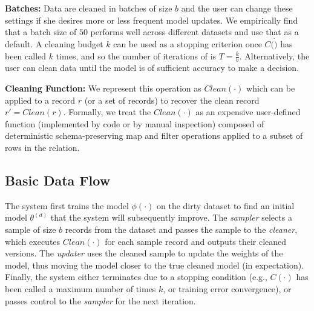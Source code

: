 \vspace{0.25em}

\noindent\textbf{Batches: } Data are cleaned in batches of size $b$ and the user can change these settings if she desires more or less frequent model updates.
We empirically find that a batch size of $50$ performs well across different datasets and use that as a default.
A cleaning budget $k$ can be used as a stopping criterion once $C(\dot)$ has been called $k$ times, and so the number of iterations of \sys is $T = \frac{k}{b}$.
Alternatively, the user can clean data until the model is of sufficient accuracy to make a decision.

\vspace{0.25em}

\noindent\textbf{Cleaning Function: } We represent this operation as $Clean(\cdot)$ which can be applied to a record $r$ (or a set of records) to recover the clean record $r' = Clean(r)$.
Formally, we treat the $Clean(\cdot)$ as an expensive user-defined function (implemented by code or by manual inspection) composed of deterministic schema-preserving \textsf{map} and \textsf{filter} operations applied to a subset of rows in the relation. 

\subsection{Basic Data Flow} \label{df}
The system first trains the model $\phi(\cdot)$ on the dirty dataset to find an initial model $\theta^{(d)}$ that the system will subsequently improve.
The {\it sampler} selects a sample of size $b$ records from the dataset and passes
the sample to the {\it cleaner}, which executes $Clean(\cdot)$ for each sample record and outputs their cleaned versions.
The \emph{updater} uses the cleaned sample to update the weights of the model, thus moving the model closer to the true cleaned model (in expectation).
Finally, the system either terminates due to a stopping condition (e.g., $C(\cdot)$ has been called a maximum number of times $k$, or training error convergence),
or passes control to the {\it sampler} for the next iteration.

